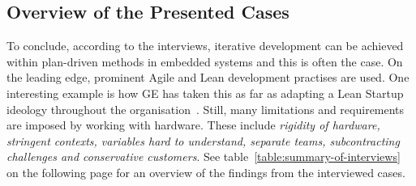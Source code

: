 \documentclass[english]{tktltiki2}
\begin{document}
\subsection{Overview of the Presented Cases}

To conclude, according to the interviews, iterative development can be achieved within plan-driven methods in embedded systems and this is often the case. On the leading edge, prominent Agile and Lean development practises are used. One interesting example is how GE has taken this as far as adapting a Lean Startup ideology throughout the organisation~\cite{BT15}. Still, many limitations and requirements are imposed by working with hardware. These include \emph{rigidity of hardware, stringent contexts, variables hard to understand, separate teams, subcontracting challenges and conservative customers}. See table~\ref{table:summary-of-interviews} on the following page for an overview of the findings from the interviewed cases.

\end{document}

